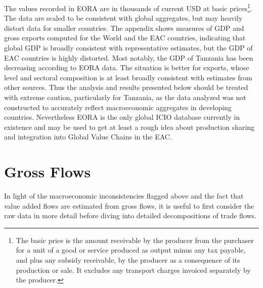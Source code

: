 \documentclass[a4paper]{article}
\begin{document}
The values recorded in EORA are in thousands of current USD at basic prices\footnote{The basic price is the amount receivable by the producer from the purchaser for a unit of a good or service produced as output minus any tax payable, and plus any subsidy receivable, by the producer as a consequence of its production or sale. It excludes any transport charges invoiced separately by the producer.}. The data are scaled to be consistent with global aggregates, but may heavily distort data for smaller countries. The appendix shows measures of GDP and gross exports computed for the World and the EAC countries, indicating that global GDP is broadly consistent with representative estimates, but the GDP of EAC countries is highly distorted. Most notably, the GDP of Tanzania has been decreasing according to EORA data. The situation is better for exports, whose level and sectoral composition is at least broadly consistent with estimates from other sources. Thus the analysis and results presented below should be treated with extreme caution, particularly for Tanzania, as the data analyzed was not constructed to accurately reflect macroeconomic aggregates in developing countries. Nevertheless EORA is the only global ICIO database currently in existence and may be used to get at least a rough idea about production sharing and integration into Global Value Chains in the EAC. %

\section{Gross Flows}
In light of the macroeconomic inconsistencies flagged above and the fact that value added flows are estimated from gross flows, it is useful to first consider the raw data in more detail before diving into detailed decompositions of trade flows. \newline
\end{document}
